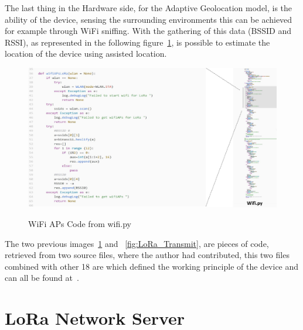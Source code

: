 The last thing in the Hardware side, for the Adaptive Geolocation model, is the ability of the device, sensing the surrounding environments this can be achieved for example through WiFi sniffing. With the gathering of this data (BSSID and RSSI), as represented in the following figure~\ref{fig:WifiAps}, is possible to estimate the location of the device using assisted location. 

\begin{figure}[htbp]
  \centering
  
    {\includegraphics[width=0.9\linewidth]{Chapters/Figures/wifi.pdf}}%
 
  \caption{WiFi APs Code from wifi.py~\cite{githubcode}}
  \label{fig:WifiAps}
\end{figure}

The two previous images~\ref{fig:WifiAps} and ~\ref{fig:LoRa_Transmit}, are pieces of code, retrieved from two source files, where the author had contributed, this two files combined with other 18 are which defined the working principle of the device and can all be found at~\cite{githubcode}. 







\section{LoRa Network Server} %
\label{sec:server}
